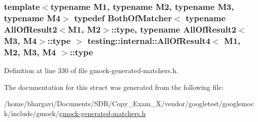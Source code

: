 \subsubsection[{\texorpdfstring{type}{type}}]{\setlength{\rightskip}{0pt plus 5cm}template$<$typename M1, typename M2, typename M3, typename M4$>$ typedef {\bf Both\+Of\+Matcher}$<$ typename {\bf All\+Of\+Result2}$<$M1, M2$>$\+::{\bf type}, typename {\bf All\+Of\+Result2}$<$M3, M4$>$\+::{\bf type} $>$ {\bf testing\+::internal\+::\+All\+Of\+Result4}$<$ M1, M2, M3, M4 $>$\+::{\bf type}}\hypertarget{structtesting_1_1internal_1_1_all_of_result4_ab277e20178bac632d4e5a39a1a407bbf}{}\label{structtesting_1_1internal_1_1_all_of_result4_ab277e20178bac632d4e5a39a1a407bbf}


Definition at line 330 of file gmock-\/generated-\/matchers.\+h.



The documentation for this struct was generated from the following file\+:\begin{DoxyCompactItemize}
\item 
/home/bhargavi/\+Documents/\+S\+D\+R/\+Copy\+\_\+\+Exam\+\_\+X/vendor/googletest/googlemock/include/gmock/\hyperlink{gmock-generated-matchers_8h}{gmock-\/generated-\/matchers.\+h}\end{DoxyCompactItemize}
